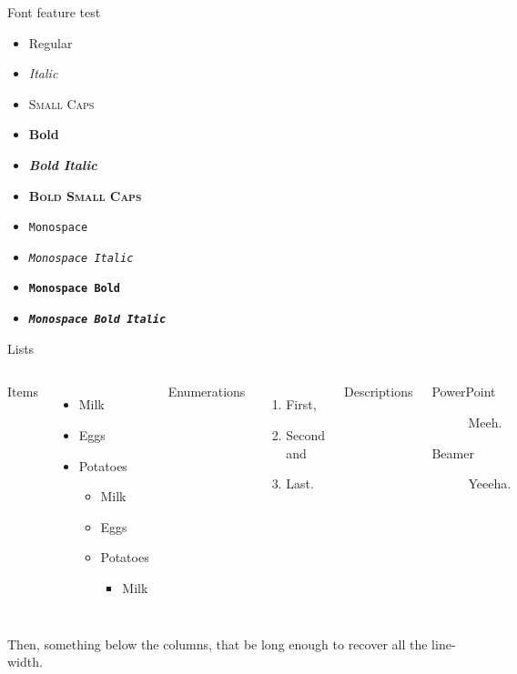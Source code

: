 \documentclass[aspectratio=169]{beamer}
\begin{document}
	\begin{frame}{Font feature test}
		\begin{itemize}
			\item Regular
			\item \textit{Italic}
			\item \textsc{Small Caps}
			\item \textbf{Bold}
			\item \textbf{\textit{Bold Italic}}
			\item \textbf{\textsc{Bold Small Caps}}
			\item \texttt{Monospace}
			\item \texttt{\textit{Monospace Italic}}
			\item \texttt{\textbf{Monospace Bold}}
			\item \texttt{\textbf{\textit{Monospace Bold Italic}}}
		\end{itemize}
	\end{frame}
		
	\begin{frame}{Lists}
		\begin{columns}[T,onlytextwidth]
				Items
				\begin{itemize}
		  			\item Milk \item Eggs \item Potatoes
					\begin{itemize}
						\item Milk \item Eggs \item Potatoes
						\begin{itemize}
							\item Milk
						 \end{itemize}
				 	\end{itemize}
				\end{itemize}
			
				Enumerations
				\begin{enumerate}
		  			\item First, \item Second and \item Last.
				\end{enumerate}
			
				Descriptions
				\begin{description}
		  			\item[PowerPoint] Meeh. \item[Beamer] Yeeeha.
				\end{description}
		\end{columns}
		
		\vspace{2em}
		Then, something below the columns, that be long enough to recover all the line-width.
	\end{frame}
	
\end{document}
